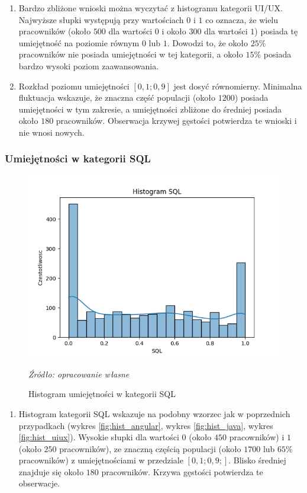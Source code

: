         \begin{enumerate}
            \item Bardzo zbliżone wnioski można wyczytać z histogramu kategorii UI/UX. Najwyższe słupki występują przy wartościach $0$ i $1$ co oznacza, że wielu pracowników (około $500$ dla wartości $0$ i około $300$ dla wartości $1$) posiada tę umiejętność na poziomie równym $0$ lub $1$. Dowodzi to, że około $25\%$ pracowników nie posiada umiejętności w tej kategorii, a około $15\%$ posiada bardzo wysoki poziom zaawansowania.
            \item Rozkład poziomu umiejętności $[0,1; 0,9]$ jest dosyć równomierny. Minimalna fluktuacja wskazuje, że znaczna część populacji (około $1200$) posiada umiejętności w tym zakresie, a umiejętności zbliżone do średniej posiada około $180$ pracowników. Obserwacja krzywej gęstości potwierdza te wnioski i nie wnosi nowych.
        \end{enumerate}
        
        \subsubsection{Umiejętności w kategorii SQL}
        \begin{figure}[H]
            \centering
            \includegraphics[width=\linewidth]{chapters/Images/hist_sql.png}
            \cprotect\caption{Histogram umiejętności w kategorii SQL}
            \textit{Źródło: opracowanie własne} 
            \label{fig:hist_sql}
        \end{figure}

        \begin{enumerate}
            \item Histogram kategorii SQL wskazuje na podobny wzorzec jak w poprzednich przypadkach (wykres \ref{fig:hist_angular}, wykres \ref{fig:hist_java}, wykres \ref{fig:hist_uiux}). Wysokie słupki dla wartości $0$ (około $450$ pracowników) i $1$ (około $250$ pracowników), ze znaczną częścią populacji (około $1700$ lub $65\%$ pracowników) z umiejętnościami w przedziale $[0,1; 0,9;]$. Blisko średniej znajduje się około $180$ pracowników. Krzywa gęstości potwierdza te obserwacje.
        \end{enumerate}
        
